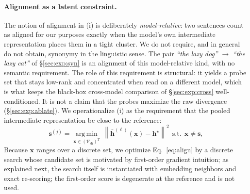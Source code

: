 \documentclass[11pt]{article}
\newcommand{\Vsh}{\mathcal{V}_{\mathrm{sh}}}
\newcommand{\norm}[1]{\left\lVert #1 \right\rVert}
\newcommand{\argmin}{\operatorname*{arg\,min}}
\theoremstyle{definition}
\begin{document}
\paragraph{Alignment as a latent constraint.}
The notion of alignment in (i) is deliberately \emph{model-relative}: two
sentences count as aligned for our purposes exactly when the model's own
intermediate representation places them in a tight cluster. We do not require,
and in general do not obtain, synonymy in the linguistic sense. The pair
\emph{``the lazy dog''} $\to$ \emph{``the lazy cat''} of \S\ref{sec:exp:syn}
is an alignment of this model-relative kind, with no semantic requirement. The
role of this requirement is structural: it yields a probe set that stays
low-rank and concentrated when read on a different model, which is what keeps
the black-box cross-model comparison of \S\ref{sec:exp:cross} well-conditioned.
It is not a claim that the probes maximize the raw divergence
(\S\ref{sec:exp:ablate}). We operationalize (i) as the
requirement that the pooled intermediate representation be close to the
reference:
\begin{equation}
  \bm{s}^{(j)} = \argmin_{\bm{x} \in (\Vsh)^T}
  \ \norm{\bar{\bm{h}}^{(\ell)}(\bm{x}) - \bm{h}^\star}^2
  \ \ \text{s.t.}\ \ \bm{x} \ne \bm{s},
  \label{eq:align}
\end{equation}
Because $\bm{x}$ ranges over a discrete set, we optimize
Eq.~\eqref{eq:align} by a discrete search whose candidate set is motivated by
first-order gradient intuition; as explained next, the search itself is
instantiated with embedding neighbors and exact re-scoring; the first-order
score is degenerate at the reference and is not used.
\end{document}

